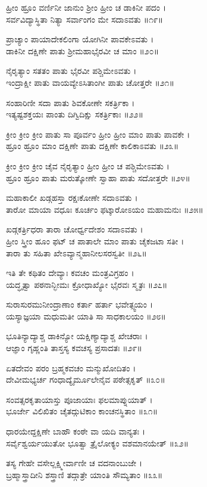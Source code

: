 ಹ್ರೀಂ ಹ್ರೂಂ ವರ್ಣಿನೀ ಜಾನುಂ ಶ್ರೀಂ ಹ್ರೀಂ ಚ ಡಾಕಿನೀ ಪದಂ ।\\
ಸರ್ವವಿದ್ಯಾಸ್ಥಿತಾ ನಿತ್ಯಾ ಸರ್ವಾಂಗಂ ಮೇ ಸದಾಽವತು ॥೧೯॥

ಪ್ರಾಚ್ಯಾಂ ಪಾಯಾದೇಕಲಿಂಗಾ ಯೋಗಿನೀ ಪಾವಕೇಽವತು ।\\
ಡಾಕಿನೀ ದಕ್ಷಿಣೇ ಪಾತು ಶ್ರೀಮಹಾಭೈರವೀ ಚ ಮಾಂ ॥೨೦॥

ನೈರೃತ್ಯಾಂ ಸತತಂ ಪಾತು ಭೈರವೀ ಪಶ್ಚಿಮೇಽವತು ।\\
ಇಂದ್ರಾಕ್ಷೀ ಪಾತು ವಾಯವ್ಯೇಽಸಿತಾಂಗೀ ಪಾತು ಚೋತ್ತರೇ ॥೨೧॥

ಸಂಹಾರಿಣೀ ಸದಾ ಪಾತು ಶಿವಕೋಣೇ ಸಕರ್ತ್ರಿಕಾ ।\\
ಇತ್ಯಷ್ಟಶಕ್ತಯಃ ಪಾಂತು ದಿಗ್ವಿದಿಕ್ಷು ಸಕರ್ತ್ರಿಕಾಃ ॥೨೨॥

ಕ್ರೀಂ ಕ್ರೀಂ ಕ್ರೀಂ ಪಾತು ಸಾ ಪೂರ್ವಂ ಹ್ರೀಂ ಹ್ರೀಂ ಮಾಂ ಪಾತು ಪಾವಕೇ ।\\
ಹ್ರೂಂ ಹ್ರೂಂ ಮಾಂ ದಕ್ಷಿಣೇ ಪಾತು ದಕ್ಷಿಣೇ ಕಾಲಿಕಾಽವತು ॥೨೩॥

ಕ್ರೀಂ ಕ್ರೀಂ ಕ್ರೀಂ ಚೈವ ನೈರೃತ್ಯಾಂ ಹ್ರೀಂ ಹ್ರೀಂ ಚ ಪಶ್ಚಿಮೇಽವತು ।\\
ಹ್ರೂಂ ಹ್ರೂಂ ಪಾತು ಮರುತ್ಕೋಣೇ ಸ್ವಾಹಾ ಪಾತು ಸದೋತ್ತರೇ ॥೨೪॥

ಮಹಾಕಾಲೀ ಖಡ್ಗಹಸ್ತಾ ರಕ್ಷಃಕೋಣೇ ಸದಾಽವತು ।\\
ತಾರೋ ಮಾಯಾ ವಧೂಃ ಕೂರ್ಚಂ ಫಟ್ಕಾರೋಽಯಂ ಮಹಾಮನುಃ ॥೨೫॥

ಖಡ್ಗಕರ್ತ್ರಿಧರಾ ತಾರಾ ಚೋರ್ಧ್ವದೇಶಂ ಸದಾಽವತು ।\\
ಹ್ರೀಂ ಸ್ತ್ರೀಂ ಹೂಂ ಫಟ್ ಚ ಪಾತಾಲೇ ಮಾಂ ಪಾತು ಚೈಕಜಟಾ ಸತೀ ।\\
ತಾರಾ ತು ಸಹಿತಾ ಖೇಽವ್ಯಾನ್ಮಹಾನೀಲಸರಸ್ವತೀ ॥೨೬॥

ಇತಿ ತೇ ಕಥಿತಂ ದೇವ್ಯಾಃ ಕವಚಂ ಮಂತ್ರವಿಗ್ರಹಂ ।\\
ಯದ್ಧೃತ್ವಾ ಪಠನಾನ್ಭೀಮಃ ಕ್ರೋಧಾಖ್ಯೋ ಭೈರವಃ ಸ್ಮೃತಃ ॥೨೭॥

ಸುರಾಸುರಮುನೀಂದ್ರಾಣಾಂ ಕರ್ತಾ ಹರ್ತಾ ಭವೇತ್ಸ್ವಯಂ ।\\
ಯಸ್ಯಾಜ್ಞಯಾ ಮಧುಮತೀ ಯಾತಿ ಸಾ ಸಾಧಕಾಲಯಂ ॥೨೮॥

ಭೂತಿನ್ಯಾದ್ಯಾಶ್ಚ ಡಾಕಿನ್ಯೋ ಯಕ್ಷಿಣ್ಯಾದ್ಯಾಶ್ಚ ಖೇಚರಾಃ ।\\
ಆಜ್ಞಾಂ ಗೃಹ್ಣಂತಿ ತಾಸ್ತಸ್ಯ ಕವಚಸ್ಯ ಪ್ರಸಾದತಃ ॥೨೯॥

ಏತದೇವಂ ಪರಂ ಬ್ರಹ್ಮಕವಚಂ ಮನ್ಮುಖೋದಿತಂ ।\\
ದೇವೀಮಭ್ಯರ್ಚ ಗಂಧಾದ್ಯೈರ್ಮೂಲೇನೈವ ಪಠೇತ್ಸಕೃತ್ ॥೩೦॥

ಸಂವತ್ಸರಕೃತಾಯಾಸ್ತು ಪೂಜಾಯಾಃ ಫಲಮಾಪ್ನುಯಾತ್ ।\\
ಭೂರ್ಜೇ ವಿಲಿಖಿತಂ ಚೈತದ್ಗುಟಿಕಾಂ ಕಾಂಚನಸ್ಥಿತಾಂ ॥೩೧॥

ಧಾರಯೇದ್ದಕ್ಷಿಣೇ ಬಾಹೌ ಕಂಠೇ ವಾ ಯದಿ ವಾನ್ಯತಃ ।\\
ಸರ್ವೈಶ್ವರ್ಯಯುತೋ ಭೂತ್ವಾ ತ್ರೈಲೋಕ್ಯಂ ವಶಮಾನಯೇತ್ ॥೩೨॥

ತಸ್ಯ ಗೇಹೇ ವಸೇಲ್ಲಕ್ಷ್ಮೀರ್ವಾಣೀ ಚ ವದನಾಂಬುಜೇ ।\\
ಬ್ರಹ್ಮಾಸ್ತ್ರಾದೀನಿ ಶಸ್ತ್ರಾಣಿ ತದ್ಗಾತ್ರೇ ಯಾಂತಿ ಸೌಮ್ಯತಾಂ ॥೩೩॥

